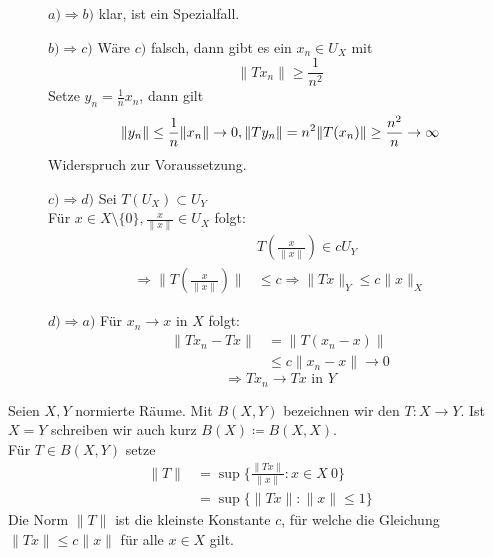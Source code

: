 \begin{beweis}
	\begin{description}
		\item[] $a) \Rightarrow b)$ klar, ist ein Spezialfall.
		\item[] $b) \Rightarrow c)$ Wäre $c)$ falsch, dann gibt es ein $x_{n} \in U_{X}$ mit 
		\[ \| T x_{n} \| \geq \frac{1}{n^{2}} \]
		Setze $y_{n} = \frac{1}{n} x_{n}$, dann gilt
		\[
			\| y_{n} \| \leq \frac{1}{n} \| x_{n} \| \rightarrow 0, \\
			\| T y_{n} \| = n^{2} \| T(x_{n}) \| \geq \frac{n^2}{n} \rightarrow \infty 
		 \]
		 Widerspruch zur Voraussetzung.
		 \item[] $c) \Rightarrow d)$ Sei $T(U_{X}) \subset U_{Y}$ \\
		 Für $x \in X \setminus \{0\}, \frac{x}{\| x \|} \in U_{X}$ folgt:
		 \begin{align*}
		 	&T \left( \frac{x}{\| x \|} \right) \in c U_{Y} \\
		 	\Rightarrow \| T \left( \frac{x}{\| x \|} \right) \| & \leq c
		 	\Rightarrow \| T x \|_{Y} \leq c \| x \|_{X}			
		 \end{align*}
		 \item[] $d) \Rightarrow a)$ Für $x_{n} \rightarrow x$ in $X$ folgt:
		 \begin{align*}
		 	\| T x_{n} - T x \| & = \| T ( x_{n} - x ) \| \\
		 						& \leq c \| x_{n} - x \| \rightarrow 0
		 \end{align*} \[ \Rightarrow T x_{n} \rightarrow T x \text{ in } Y \]
	\end{description}
\end{beweis}
	
	
\begin{definition}
	Seien $X, Y$ normierte Räume. Mit $B(X, Y)$ bezeichnen wir den  $T: X \rightarrow Y$. Ist $ X = Y$ schreiben wir auch kurz $B(X) \coloneqq B(X, X)$. \\
	
	Für $T \in B(X, Y)$ setze
	\begin{align*}
		\| T \| & = \sup \{ \frac{\| Tx \|}{\| x \|}: x \in X \ {0} \} \\
				& = \sup \{ \| Tx \|: \| x \| \leq 1 \}
	\end{align*}
	Die Norm $\| T \|$ ist die kleinste Konstante $c$, für welche die Gleichung $\| Tx \| \leq c \| x \|$ für alle $x \in X$ gilt.
\end{definition}


